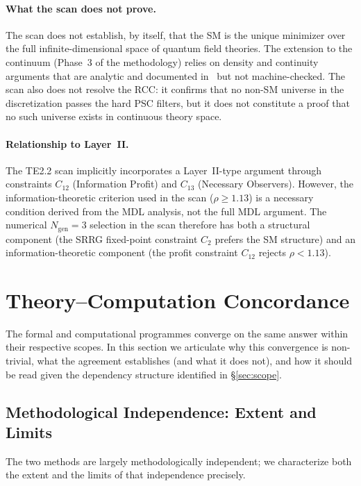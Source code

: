 \documentclass[11pt,twocolumn]{article}
\theoremstyle{remark}
\begin{document}
\paragraph{What the scan does not prove.}
The scan does not establish, by itself, that the SM is the unique
minimizer over the full infinite-dimensional space of quantum field
theories.
The extension to the continuum (Phase~3 of the methodology) relies
on density and continuity arguments that are analytic and documented
in~\cite{SpivackPSCConcordance} but not machine-checked.
The scan also does not resolve the RCC: it confirms that no
non-SM universe in the discretization passes the hard PSC filters,
but it does not constitute a proof that no such universe exists
in continuous theory space.

\paragraph{Relationship to Layer~II.}
The TE2.2 scan implicitly incorporates a Layer~II-type argument
through constraints $C_{12}$ (Information Profit) and $C_{13}$
(Necessary Observers).
However, the information-theoretic criterion used in the scan
($\rho\geq 1.13$) is a necessary condition derived from the MDL
analysis, not the full MDL argument.
The numerical $N_{\mathrm{gen}}=3$ selection in the scan therefore
has both a structural component (the SRRG fixed-point constraint
$C_2$ prefers the SM structure) and an information-theoretic
component (the profit constraint $C_{12}$ rejects $\rho<1.13$).

\section{Theory--Computation Concordance}
\label{sec:concordance}

The formal and computational programmes converge on the same answer
within their respective scopes.
In this section we articulate why this convergence is non-trivial,
what the agreement establishes (and what it does not), and how it
should be read given the dependency structure identified in
§\ref{sec:scope}.

\subsection{Methodological Independence: Extent and Limits}
\label{sec:independence}

The two methods are largely methodologically independent; we characterize
both the extent and the limits of that independence precisely.
\end{document}
